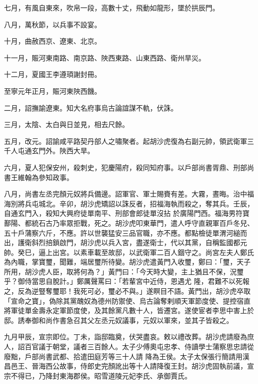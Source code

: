 \begin{pinyinscope}
 七月，有風自東來，吹帛一段，高數十丈，飛動如龍形，墜於拱辰門。



 八月，萬秋節，以兵事不設宴。



 十月，曲赦西京、遼東、北京。



 十一月，賑河東南路、南京路、陜西東路、山東西路、衛州旱災。



 十二月，夏國王李遵頊謝封冊。



 至寧元年正月，賑河東陜西饑。



 二月，詔撫諭遼東。知大名府事烏古論誼謀不軌，伏誅。



 三月，太陰、太白與日並見，相去尺餘。



 五月，改元。詔諭咸平路契丹部人之嘯聚者。起胡沙虎復為右副元帥，領武衛軍三千人屯通玄門外。陜西大旱。



 六月，夏人犯保安州，殺刺史，犯慶陽府，殺同知府事。以戶部尚書胥鼎、刑部尚書王維翰為參知政事。



 八月，尚書左丞完顏元奴將兵備邊。詔軍官、軍士賜賚有差。大霧，晝晦。治中福海別將兵屯城北。辛卯，胡沙虎矯詔以誅反者，招福海執而殺之，奪其兵。壬辰，自通玄門入，殺知大興府徒單南平、刑部會郎徒單沒拈
 於廣陽門西。福海男符寶鄯陽、都統石古乃率眾拒戰，死之。胡沙虎叩東華門，遣人呼守直親軍百戶冬兒、五十戶蒲察六斤，不應。許以世襲猛安三品官職，亦不應。都點檢徒單渭河縋而出，護衛斜烈掊鎖啟門，胡沙虎以兵入宮，盡遂衛士，代以其黨，自稱監國都元帥。癸巳，逼上出宮。以素車載至故邸，以武衛軍二百人錮守之。尚宮左夫人鄭氏為內職，掌寶璽，聞難，端居璽所待變。胡沙虎遣黃門入收璽，鄭曰：「璽，天子所用，胡沙虎人臣，取將何為？」黃門曰：「今天時大變，主上猶且不保，況璽乎？御侍當思自脫計。」鄭厲聲罵曰：「若輩宮中近侍，恩遇尤
 隆，君難不以死報之，反為逆豎奪璽耶！我死可必，璽必不與。」遂瞑目不語。黃門出，胡沙虎卒取「宣命之寶」，偽除其黨醜奴為德州防禦使、烏古論奪剌順天軍節度使、提控宿直將軍徒單金壽永定軍節度使，及其餘黨凡數十人，皆遷宮。遂使宦者李思中害上於邸。誘奉御和尚作書急召其父左丞元奴議事，元奴以軍來，並其子皆殺之。



 九月甲辰，宣宗即位。丁未，詣邸臨奠，伏哭盡哀。敕以禮改葬。胡沙虎請廢為庶人，詔百官議于朝堂，議者三百餘人。太子少傅奧屯忠孝、侍讀學士蒲察思忠請從廢黜，戶部尚書武都、拾遣田庭芳等三十人請
 降為王侯。太子太保張行簡請用漢昌邑王、晉海西公故事，侍郎史完顏訛出等十人請降復王封。胡沙虎固執前議，宣宗不得已，乃降封東海郡侯。昭雪道陵元妃李氏、承御賈氏。




\end{pinyinscope}
